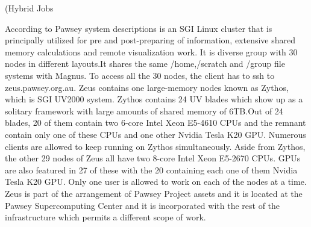 \begin{Document}
{\Subsubsection(Hybrid Jobs}



According to Pawsey system descriptions is an SGI Linux cluster that is principally utilized for pre and post-preparing of information, extensive shared memory calculations and remote visualization work.
It is diverse group with 30 nodes in different layouts.It shares the same /home,/scratch and /group file systems with Magnus. 
To access all the 30 nodes, the client has to ssh to zeus.pawsey.org.au.
Zeus contains one large-memory nodes known as Zythos, which is SGI UV2000 system. 
Zythos contains 24 UV blades which show up as a solitary framework with large amounts of shared memory of 6TB.Out of 24 blades, 20 of them contain two 6-core Intel Xeon E5-4610 CPUs and the remnant contain only one of these CPUs and one other Nvidia Tesla K20 GPU. 
Numerous clients are allowed to keep running on Zythos simultaneously.
Aside from Zythos, the other 29 nodes of Zeus all have two 8-core Intel Xeon E5-2670 CPUs. 
GPUs are also featured in 27 of these with the 20 containing each one of them Nvidia Tesla K20 GPU. 
Only one user is allowed to work on each of the nodes at a time.
Zeus is part of the arrangement of Pawsey Project assets and it is located at the Pawsey Supercomputing Center and it is incorporated with the rest of the infrastructure which permits a different scope of work.
 

















































\end{Document}
